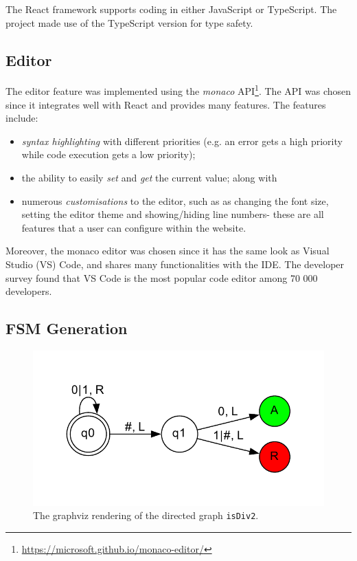 The React framework supports coding in either JavaScript or TypeScript. The project made use of the TypeScript version for type safety.

\subsection{Editor}

The editor feature was implemented using the \emph{monaco} API\footnote{\url{https://microsoft.github.io/monaco-editor/}}. The API was chosen since it integrates well with React and provides many features. The features include:
\begin{itemize}
    \item \emph{syntax highlighting} with different priorities (e.g. an error gets a high priority while code execution gets a low priority);
    \item the ability to easily \emph{set} and \emph{get} the current value; along with
    \item numerous \emph{customisations} to the editor, such as as changing the font size, setting the editor theme and showing/hiding line numbers- these are all features that a user can configure within the website.
\end{itemize}
Moreover, the monaco editor was chosen since it has the same look as Visual Studio (VS) Code, and shares many functionalities with the IDE. The \citet{stack_overflow} developer survey 
found that VS Code is the most popular code editor among 70 000 developers.

\subsection{FSM Generation}
\begin{figure}[htb]
    \centering
    \includegraphics[scale=0.6]{images/graphviz_isDiv2.pdf}
    \caption{The graphviz rendering of the directed graph \texttt{isDiv2}.}
    \label{fig:graphviz_isDiv2}
\end{figure}


